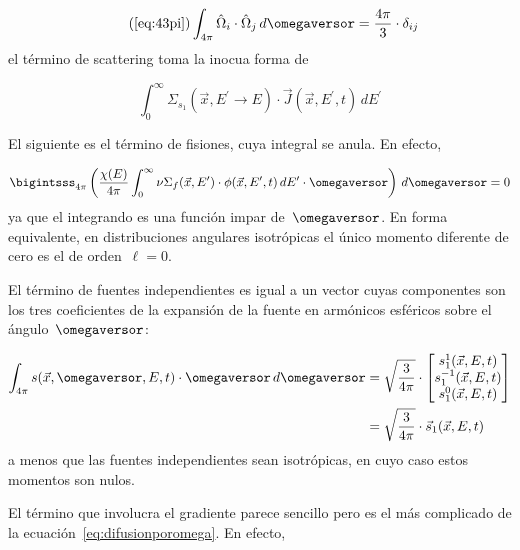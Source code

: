 \begin{equation}\tag{\ref{eq:43pi}}
 \int_{4\pi} \hat{\Omega}_i \cdot \hat{\Omega}_j \, d\omegaversor = \frac{4\pi}{3} \cdot \delta_{ij}
\end{equation}
%
el término de scattering toma la inocua forma de


\begin{equation}\label{eq:difusion3}
 \int_0^\infty \Sigma_{s_1}(\vec{x},E^\prime \rightarrow E) \cdot \vec{J}(\vec{x}, E^\prime,t) \, dE^\prime
\end{equation}

\medskip

El siguiente es el término de fisiones, cuya integral se anula. En efecto,

\begin{equation}\label{eq:difusion4}
\bigintsss_{4\pi} \left( \frac{\chi(E)}{4\pi} \int_{0}^{\infty} \nu\Sigma_f(\vec{x}, E^\prime) \cdot \phi(\vec{x}, E^\prime, t) \, dE^\prime  \cdot  \omegaversor \right) \, d\omegaversor = 0
\end{equation}
%
ya que el integrando es una función impar de~${\omegaversor}$. En forma equivalente, en distribuciones angulares isotrópicas el único momento diferente de cero es el de orden~$\ell=0$.

\medskip

El término de fuentes independientes es igual a un vector cuyas componentes son los tres coeficientes de la expansión de la fuente en armónicos esféricos sobre el ángulo~$\omegaversor$:

\begin{align}
\int_{4\pi} s(\vec{x}, \omegaversor, E, t)  \cdot  \omegaversor \, d\omegaversor
& =
\sqrt{\frac{3}{4\pi}} \cdot 
\begin{bmatrix}
s_1^{1}(\vec{x},E,t) \\
s_1^{-1}(\vec{x},E,t) \\
s_1^{0}(\vec{x},E,t) \\
\end{bmatrix}
\nonumber \\
& =
\sqrt{\frac{3}{4\pi}} \cdot \vec{s}_1(\vec{x},E,t) \label{eq:difusion5}
\end{align}
%
a menos que las fuentes independientes sean isotrópicas, en cuyo caso estos momentos son nulos.

\medskip

El término que involucra el gradiente parece sencillo pero es el más complicado de la ecuación~\eqref{eq:difusionporomega}. En efecto,

